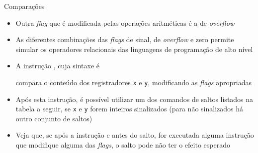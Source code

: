 \begin{frame}[fragile]{Comparações}

    \begin{itemize}
        \item Outra \textit{flag} que é modificada pelas operações aritméticas é a de 
            \textit{overflow}

        \item As diferentes combinações das \textit{flags} de sinal, de \textit{overflow} e zero
            permite simular os operadores relacionais das linguagens de programação de 
            alto nível

        \item A instrução , cuja sintaxe é


        compara o conteúdo dos registradores \texttt{x} e \texttt{y}, modificando as \textit{flags}
        apropriadas

        \item Após esta instrução, é possível utilizar um dos comandos de saltos listados na
            tabela a seguir, se \texttt{x} e \texttt{y} forem inteiros sinalizados
            (para não sinalizados há outro conjunto de saltos)

        \item Veja que, se após a instrução  e antes do salto, for executada
            alguma instrução que modifique alguma das \textit{flags}, o salto pode não ter o
            efeito esperado

    \end{itemize}

\end{frame}

